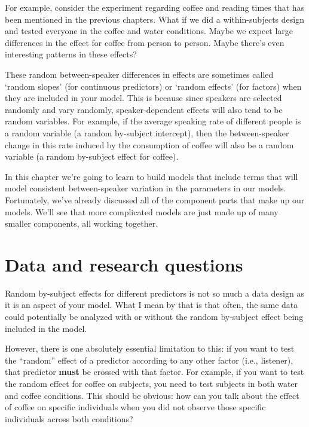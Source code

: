 \documentclass[
]{book}
\begin{document}
For example, consider the experiment regarding coffee and reading times that has been mentioned in the previous chapters. What if we did a within-subjects design and tested everyone in the coffee and water conditions. Maybe we expect large differences in the effect for coffee from person to person. Maybe there's even interesting patterns in these effects?

These random between-speaker differences in effects are sometimes called `random slopes' (for continuous predictors) or `random effects' (for factors) when they are included in your model. This is because since speakers are selected randomly and vary randomly, speaker-dependent effects will also tend to be random variables. For example, if the average speaking rate of different people is a random variable (a random by-subject intercept), then the between-speaker change in this rate induced by the consumption of coffee will also be a random variable (a random by-subject effect for coffee).

In this chapter we're going to learn to build models that include terms that will model consistent between-speaker variation in the parameters in our models. Fortunately, we've already discussed all of the component parts that make up our models. We'll see that more complicated models are just made up of many smaller components, all working together.

\hypertarget{data-and-research-questions-5}{%
\section{Data and research questions}\label{data-and-research-questions-5}}

Random by-subject effects for different predictors is not so much a data design as it is an aspect of your model. What I mean by that is that often, the same data could potentially be analyzed with or without the random by-subject effect being included in the model.

However, there is one absolutely essential limitation to this: if you want to test the ``random'' effect of a predictor according to any other factor (i.e., listener), that predictor \textbf{must} be crossed with that factor. For example, if you want to test the random effect for coffee on subjects, you need to test subjects in both water and coffee conditions. This should be obvious: how can you talk about the effect of coffee on specific individuals when you did not observe those specific individuals across both conditions?
\end{document}
